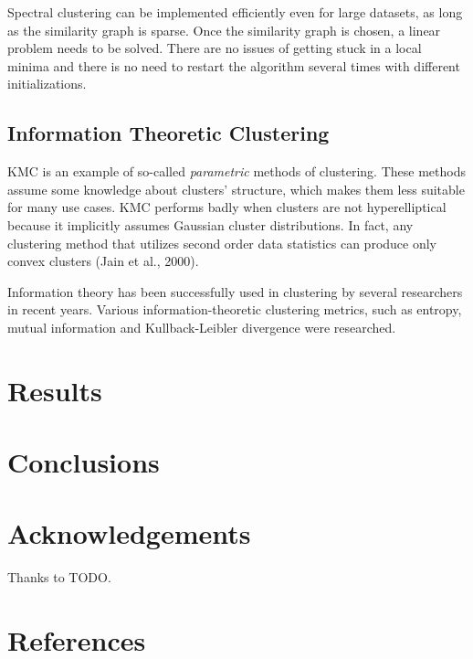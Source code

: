 \documentclass[conference]{IEEEtran}
\begin{document}
Spectral clustering can be implemented efficiently even for large datasets, as long as
the similarity graph is sparse. Once the similarity graph is chosen, a linear problem needs to
be solved. There are no issues of getting stuck in a local minima and there is no need to
restart the algorithm several times with different initializations.

\subsection{Information Theoretic Clustering}%
KMC is an example of so-called \textit{parametric} methods of clustering. These
methods assume some knowledge about clusters' structure, which makes them less
suitable for many use cases. KMC performs badly when clusters are not hyperelliptical
because it implicitly assumes Gaussian cluster distributions. In fact, any clustering method
that utilizes second order data statistics can produce only convex clusters (Jain et al., 2000).

Information theory has been successfully used in clustering by several researchers in recent years.
Various information-theoretic clustering metrics, such as entropy, mutual information and
Kullback-Leibler divergence were researched.

\section{Results}

\section{Conclusions}

\section*{Acknowledgements}
Thanks to TODO.

\section*{References}
\end{document}
